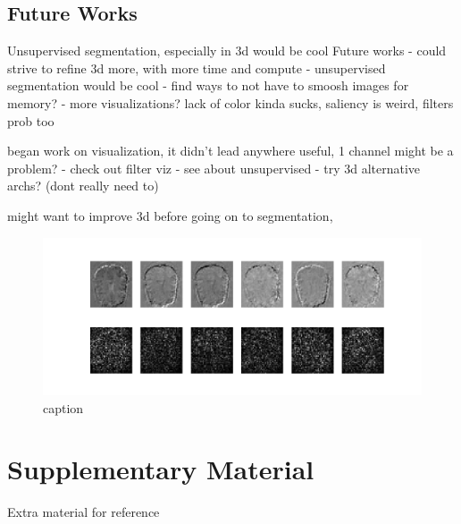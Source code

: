 \documentclass[10pt,twocolumn,letterpaper]{article}
\begin{document}
\subsection{Future Works}\label{subsec:future-works}
Unsupervised segmentation, especially in 3d would be cool
Future works
- could strive to refine 3d more, with more time and compute
- unsupervised segmentation would be cool
- find ways to not have to smoosh images for memory?
- more visualizations? lack of color kinda sucks, saliency is weird, filters prob too

began work on visualization, it didn't lead anywhere useful, 1 channel might be a problem?
- check out filter viz
- see about unsupervised
- try 3d alternative archs? (dont really need to)

might want to improve 3d before going on to segmentation,

 \begin{figure}
  \includegraphics[width=\linewidth]{images/saliency.png}
  \caption{caption}
  \label{fig:saliency}
\end{figure}

{\small


}

\section{Supplementary Material}\label{sec:supplementary}

Extra material for reference
\end{document}
